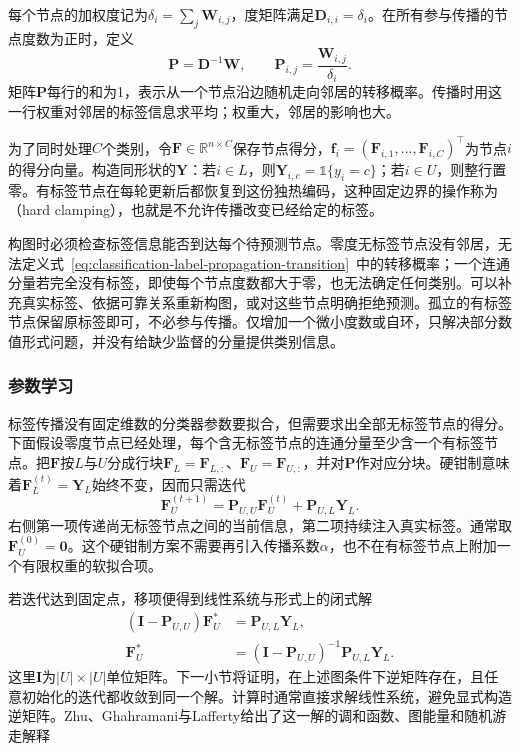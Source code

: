 每个节点的加权度记为$\delta_i=\sum_j\bm{W}_{i,j}$，度矩阵满足$\bm{D}_{i,i}=\delta_i$。在所有参与传播的节点度数为正时，定义
\begin{equation}
  \label{eq:classification-label-propagation-transition}
  \bm{P}=\bm{D}^{-1}\bm{W},
  \qquad
  \bm{P}_{i,j}=\frac{\bm{W}_{i,j}}{\delta_i}.
\end{equation}
矩阵$\bm{P}$每行的和为1，表示从一个节点沿边随机走向邻居的转移概率。传播时用这一行权重对邻居的标签信息求平均；权重大，邻居的影响也大。

为了同时处理$C$个类别，令$\bm{F}\in\mathbb{R}^{n\times C}$保存节点得分，$\bm{f}_i=(\bm{F}_{i,1},\dots,\bm{F}_{i,C})^\top$为节点$i$的得分向量。构造同形状的$\bm{Y}$：若$i\in L$，则$\bm{Y}_{i,c}=\mathbb{1}\{y_i=c\}$；若$i\in U$，则整行置零。有标签节点在每轮更新后都恢复到这份独热编码，这种固定边界的操作称为（hard clamping），也就是不允许传播改变已经给定的标签。

构图时必须检查标签信息能否到达每个待预测节点。零度无标签节点没有邻居，无法定义式~\eqref{eq:classification-label-propagation-transition}~中的转移概率；一个连通分量若完全没有标签，即使每个节点度数都大于零，也无法确定任何类别。可以补充真实标签、依据可靠关系重新构图，或对这些节点明确拒绝预测。孤立的有标签节点保留原标签即可，不必参与传播。仅增加一个微小度数或自环，只解决部分数值形式问题，并没有给缺少监督的分量提供类别信息。

\subsubsection{参数学习}
\label{sec:classification-label-propagation-learning}

标签传播没有固定维数的分类器参数要拟合，但需要求出全部无标签节点的得分。下面假设零度节点已经处理，每个含无标签节点的连通分量至少含一个有标签节点。把$\bm{F}$按$L$与$U$分成行块$\bm{F}_L=\bm{F}_{L,:}$、$\bm{F}_U=\bm{F}_{U,:}$，并对$\bm{P}$作对应分块。硬钳制意味着$\bm{F}_L^{(t)}=\bm{Y}_L$始终不变，因而只需迭代
\begin{equation}
  \label{eq:classification-label-propagation-iteration}
  \bm{F}_U^{(t+1)}
    =\bm{P}_{U,U}\bm{F}_U^{(t)}
     +\bm{P}_{U,L}\bm{Y}_L.
\end{equation}
右侧第一项传递尚无标签节点之间的当前信息，第二项持续注入真实标签。通常取$\bm{F}_U^{(0)}=\bm{0}$。这个硬钳制方案不需要再引入传播系数$\alpha$，也不在有标签节点上附加一个有限权重的软拟合项。

若迭代达到固定点，移项便得到线性系统与形式上的闭式解
\begin{equation}
  \label{eq:classification-label-propagation-solution}
  \begin{aligned}
    (\bm{I}-\bm{P}_{U,U})\bm{F}_U^\ast
      &=\bm{P}_{U,L}\bm{Y}_L,\\
    \bm{F}_U^\ast
      &=(\bm{I}-\bm{P}_{U,U})^{-1}
        \bm{P}_{U,L}\bm{Y}_L.
  \end{aligned}
\end{equation}
这里$\bm{I}$为$|U|\times|U|$单位矩阵。下一小节将证明，在上述图条件下逆矩阵存在，且任意初始化的迭代都收敛到同一个解。计算时通常直接求解线性系统，避免显式构造逆矩阵。Zhu、Ghahramani与Lafferty给出了这一解的调和函数、图能量和随机游走解释

